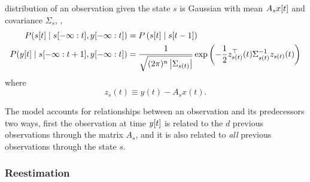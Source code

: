 distribution of an observation given the state $s$ is Gaussian with
mean $A_s {x}{[t]}$ and covariance $\Sigma_s$, \ie,
\begin{align}
  \label{eq:assume_markovVARG}
  P({s}{[t]}\mid s[-\infty:t],y[-\infty:t]) &= 
  P\left({s}{[t]}\mid {s}{[t-1]}\right)\\
  \label{eq:assume_outputVARG}
  P({y}{[t]}\mid s[-\infty:t+1],y[-\infty:t]) &=
    \frac{1}{\sqrt{ (2 \pi)^n \left|\Sigma_{s(t)}\right|}}
    \exp\left({-\frac{1}{2} z_{s(t)}^\top(t) \Sigma_{s(t)}^{-1}
    z_{s(t)}(t)} \right)
\end{align}
where
\begin{equation*}
z_s(t) \equiv y(t) - A_s x(t).  
\end{equation*}

The model accounts for relationships between an observation and its
predecessors two ways, first the observation at time ${y}{[t]}$ is
related to the $d$ previous observations through the matrix $A_s$, and
it is also related to \emph{all} previous observations through the state $s$.

\subsubsection{Reestimation}

